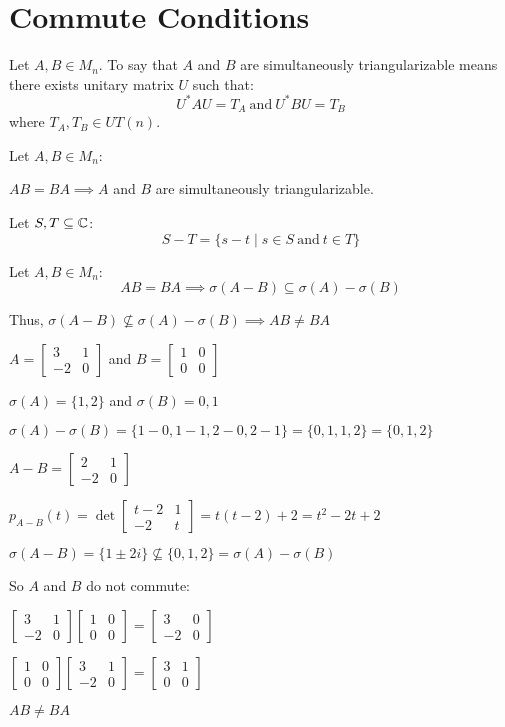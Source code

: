 \documentclass[letterpaper,12pt,fleqn]{article}
\renewcommand{\o}{\sigma}
\begin{document}
\section*{Commute Conditions}

\begin{definition}
  Let $A,B\in M_n$. To say that $A$ and $B$ are simultaneously triangularizable means
  there exists unitary matrix $U$ such that:
  \[U^*AU=T_A\ \mbox{and} \ U^*BU=T_B\]
  where $T_A,T_B\in UT(n)$.
\end{definition}

\begin{theorem}
  Let $A,B\in M_n$:

  $AB=BA\implies A$ and $B$ are simultaneously triangularizable.
\end{theorem}

\begin{definition}
  Let $S,T\subseteq\mathbb{C}$:
  \[S-T=\{s-t\mid s\in S\ \mbox{and}\ t\in T\}\]
\end{definition}

\begin{theorem}
  Let $A,B\in M_n$:
  \[AB=BA\implies \o(A-B)\subseteq\o(A)-\o(B)\]
\end{theorem}

\begin{example}
  \newcommand{\ea}{\begin{bmatrix} 3 & 1 \\ -2 & 0 \end{bmatrix}}
  \newcommand{\eb}{\begin{bmatrix} 1 & 0 \\ 0 & 0 \end{bmatrix}}

  Thus, $\o(A-B)\not\subseteq\o(A)-\o(B)\implies AB\ne BA$

  $A=\ea$ and $B=\eb$

  $\o(A)=\{1,2\}$ and $\o(B)={0,1}$

  $\o(A)-\o(B)=\{1-0,1-1,2-0,2-1\}=\{0,1,1,2\}=\{0,1,2\}$

  $A-B=\begin{bmatrix} 2 & 1 \\ -2 & 0 \end{bmatrix}$

  $p_{A-B}(t)=\det\begin{bmatrix} t-2 & 1 \\ -2 & t \end{bmatrix}=t(t-2)+2=t^2-2t+2$

  $\o(A-B)=\{1\pm2i\}\not\subseteq\{0,1,2\}=\o(A)-\o(B)$

  So $A$ and $B$ do not commute:

  $\ea\eb=\begin{bmatrix} 3 & 0 \\ -2 & 0 \end{bmatrix}$
  
  $\eb\ea=\begin{bmatrix} 3 & 1 \\ 0 & 0 \end{bmatrix}$

  $AB\ne BA$
\end{example}
\end{document}

